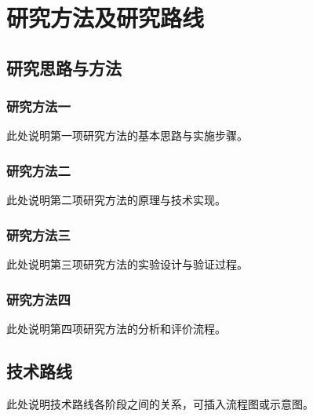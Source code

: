 \chapter{研究方法及研究路线}

\section{研究思路与方法}
\subsection{研究方法一}
此处说明第一项研究方法的基本思路与实施步骤。

\subsection{研究方法二}
此处说明第二项研究方法的原理与技术实现。

\subsection{研究方法三}
此处说明第三项研究方法的实验设计与验证过程。

\subsection{研究方法四}
此处说明第四项研究方法的分析和评价流程。

\section{技术路线}
此处说明技术路线各阶段之间的关系，可插入流程图或示意图。

